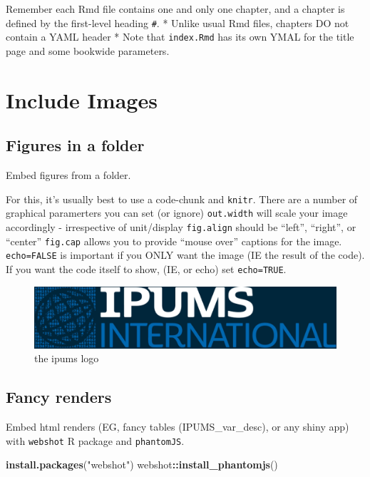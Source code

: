 \documentclass[
]{book}
\newenvironment{Shaded}{\begin{snugshade}}{\end{snugshade}}
\newcommand{\FunctionTok}[1]{\textcolor[rgb]{0.13,0.29,0.53}{\textbf{#1}}}
\newcommand{\NormalTok}[1]{#1}
\newcommand{\SpecialCharTok}[1]{\textcolor[rgb]{0.81,0.36,0.00}{\textbf{#1}}}
\newcommand{\StringTok}[1]{\textcolor[rgb]{0.31,0.60,0.02}{#1}}
\begin{document}
Remember each Rmd file contains one and only one chapter, and a chapter
is defined by the first-level heading \texttt{\#}.
* Unlike usual Rmd files, chapters DO not contain a YAML header
* Note that \texttt{index.Rmd} has its own YMAL for the title page and some bookwide parameters.

\hypertarget{include-images}{%
\section*{Include Images}\label{include-images}}

\hypertarget{figures-in-a-folder}{%
\subsection{Figures in a folder}\label{figures-in-a-folder}}

Embed figures from a folder.

For this, it's usually best to use a code-chunk and \texttt{knitr}. There are a
number of graphical paramerters you can set (or ignore) \texttt{out.width} will
scale your image accordingly - irrespective of unit/display \texttt{fig.align}
should be ``left'', ``right'', or ``center'' \texttt{fig.cap} allows you to provide
``mouse over'' captions for the image. \texttt{echo=FALSE} is important if you
ONLY want the image (IE the result of the code). If you want the code
itself to show, (IE, or echo) set \texttt{echo=TRUE}.

\begin{figure}

{\centering \includegraphics[width=0.5\linewidth]{imgs/ipums_i_logo} 

}

\caption{the ipums logo}\label{fig:unnamed-chunk-43}
\end{figure}

\hypertarget{fancy-renders}{%
\subsection{Fancy renders}\label{fancy-renders}}

Embed html renders (EG, fancy tables (IPUMS\_var\_desc), or any shiny app)
with \texttt{webshot} R package and \texttt{phantomJS}.

\begin{Shaded}
\begin{Highlighting}[]
\FunctionTok{install.packages}\NormalTok{(}\StringTok{"webshot"}\NormalTok{)}
\NormalTok{webshot}\SpecialCharTok{::}\FunctionTok{install\_phantomjs}\NormalTok{()}
\end{Highlighting}
\end{Shaded}
\end{document}
